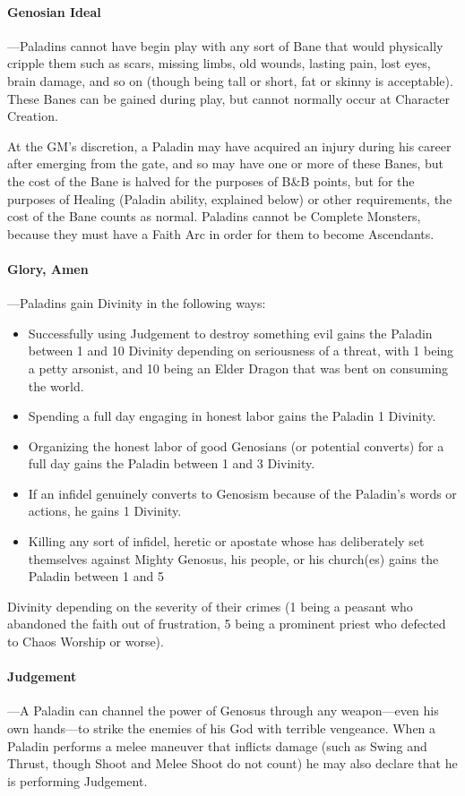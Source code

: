 \documentclass[oneside,11pt,english]{book}
\begin{document}
\paragraph{Genosian Ideal}
---\quad Paladins cannot have begin play with any sort of Bane that would physically cripple them such as 
scars, missing limbs, old wounds, lasting pain, lost eyes, brain damage, and so on (though being 
tall or short, fat or skinny is acceptable). These Banes can be gained during play, but cannot 
normally occur at Character Creation. 

At the GM's discretion, a Paladin may have acquired an 
injury during his career after emerging from the gate, and so may have one or more of these
Banes, but the cost of the Bane is halved for the purposes of B\&B points, but for the purposes of
Healing (Paladin ability, explained below) or other requirements, the cost of the Bane counts as normal.
Paladins cannot be Complete Monsters, because they must have a Faith Arc in order for them to become Ascendants. 
\paragraph{Glory, Amen}
---\quad Paladins gain Divinity in the following ways:
\begin{itemize}
\item Successfully using Judgement to destroy something evil gains the Paladin between 1 and 
  10 Divinity depending on seriousness of a threat, with 1 being a petty arsonist, and 10 
  being an Elder Dragon that was bent on consuming the world. 
\item Spending a full day engaging in honest labor gains the Paladin 1 Divinity. 
\item Organizing the honest labor of good Genosians (or potential converts) for a full day gains 
  the Paladin between 1 and 3 Divinity. 
\item If an infidel genuinely converts to Genosism because of the Paladin's words or actions, he 
  gains 1 Divinity. 
\item Killing any sort of infidel, heretic or apostate whose has deliberately set themselves 
  against Mighty Genosus, his people, or his church(es) gains the Paladin between 1 and 5 
\end{itemize}
Divinity depending on the severity of their crimes (1 being a peasant who abandoned the faith out of frustration, 5 being a prominent priest who defected to Chaos Worship or worse).
\paragraph{Judgement}
---\quad A Paladin can channel the power of Genosus through any weapon—even his own hands—to strike the enemies of his God with terrible vengeance. When a Paladin performs a melee maneuver that inflicts damage (such as Swing and Thrust, though Shoot and Melee Shoot do not count) he may also declare that he is performing Judgement.\par
\end{document}

